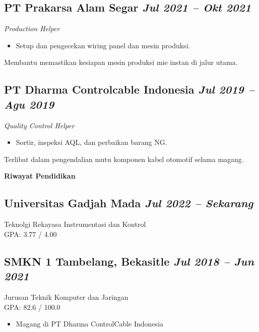 \documentclass[a4paper,11pt]{article}
\begin{document}
{	\subsection*{PT Prakarsa Alam Segar \hfill \textnormal{\textit{Jul 2021 – Okt 2021}}}
	\textit{Production Helper}
	\begin{itemize}
		\item Setup dan pengecekan wiring panel dan mesin produksi.
	\end{itemize}
	\noindent Membantu memastikan kesiapan mesin produksi mie instan di jalur utama.\\
	
	\subsection*{PT Dharma Controlcable Indonesia \hfill \textnormal{\textit{Jul 2019 – Agu 2019}}}
	\textit{Quality Control Helper}
	\begin{itemize}
		\item Sortir, inspeksi AQL, dan perbaikan barang NG.
	\end{itemize}
	\noindent Terlibat dalam pengendalian mutu komponen kabel otomotif selama magang.\\
	
	
	\vspace{1em}
	\begin{center}
		{\large\bfseries Riwayat Pendidikan}\\[-0.6em]
		\noindent\makebox[\linewidth]{\rule{\textwidth}{0.4pt}}
	\end{center}
	
	\subsection{Universitas Gadjah Mada \hfill \textnormal{\textit{Jul 2022 – Sekarang}}}
	Teknolgi Rekayasa Instrumentasi dan Kontrol \\
	GPA: 3.77 / 4.00
	
	\subsection{SMKN 1 Tambelang, Bekasitle \hfill \textnormal{\textit{Jul 2018 – Jun 2021}}}
	Jurusan Teknik Komputer dan Jaringan \\
	GPA: 82.6 / 100.0
	\begin{itemize}
		\item Magang di PT Dharma ControlCable Indonesia
	\end{itemize}
	
}
\end{document}
